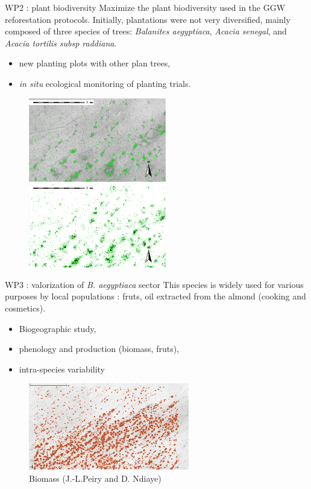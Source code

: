 \documentclass[newPxFont]{beamer}
\begin{document}
\begin{frame}[c]{WP2 : plant biodiversity}
\vspace{-2em}
Maximize the plant biodiversity used in the GGW reforestation protocols. Initially, plantations were not very diversified, mainly composed of three species of trees: \textit{Balanites aegyptiaca}, \textit{Acacia senegal}, and \textit{Acacia tortilis subsp raddiana}.
\begin{itemize}
  \item new planting plots with other plan trees,
  \item \textit{in situ} ecological monitoring of planting trials.
\end{itemize}
\begin{figure}
	\centering
	\includegraphics[width = 6cm]{img/Trees_sup15m2}
  \includegraphics[width = 6cm]{img/GRID_Trees_sup15m2}
\end{figure}
\end{frame}

\begin{frame}[c]{WP3 : valorization of \textit{B. aegyptiaca} sector}
\vspace{-2em}
This species is widely used for various purposes by local populations  : fruts, oil extracted from the almond (cooking and cosmetics).
\begin{itemize}
  \item Biogeographic study,
  \item phenology and production (biomass, fruts),
  \item intra-species variability
\end{itemize}
\vspace{-1em}
\begin{figure}
	\centering
	\includegraphics[width = 7cm]{img/Biomasse_arboree}
  \vspace{-1em}
  \caption{Biomass (J.-L.Peiry and D. Ndiaye)}
\end{figure}
\end{frame}
\end{document}
